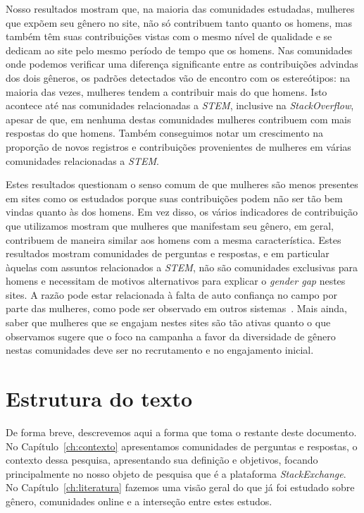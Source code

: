 Nosso resultados mostram que, na maioria das comunidades estudadas, mulheres que expõem seu gênero no site, não só contribuem tanto quanto os homens, mas também têm suas contribuições vistas com o mesmo nível de qualidade e se dedicam ao site pelo mesmo período de tempo que os homens. Nas comunidades onde podemos verificar uma diferença significante entre as contribuições advindas dos dois gêneros, os padrões detectados vão de encontro com os estereótipos: na maioria das vezes, mulheres tendem a contribuir mais do que homens. Isto acontece até nas comunidades relacionadas a \emph{STEM}, inclusive na \emph{StackOverflow}, apesar de que, em nenhuma destas comunidades mulheres contribuem com mais respostas do que homens. Também conseguimos notar um crescimento na proporção de novos registros e contribuições provenientes de mulheres em várias comunidades relacionadas a \emph{STEM}.

Estes resultados questionam o senso comum de que mulheres são menos presentes em sites como os estudados porque suas contribuições podem não ser tão bem vindas quanto às dos homens. Em vez disso, os vários indicadores de contribuição que utilizamos mostram que mulheres que manifestam seu gênero, em geral, contribuem de maneira similar aos homens com a mesma característica. Estes resultados mostram comunidades de perguntas e respostas, e em particular àquelas com assuntos relacionados a \emph{STEM}, não são comunidades exclusivas para homens e necessitam de motivos alternativos para explicar o \textit{gender gap} nestes sites. A razão pode estar relacionada à falta de auto confiança no campo por parte das mulheres, como pode ser observado em outros sistemas~\cite{piazza:report}. Mais ainda, saber que mulheres que se engajam nestes sites são tão ativas quanto o que observamos sugere que o foco na campanha a favor da diversidade de gênero nestas comunidades deve ser no recrutamento e no engajamento inicial.

\section{Estrutura do texto}

De forma breve, descrevemos aqui a forma que toma o restante deste documento. No Capítulo~\ref{ch:contexto} apresentamos comunidades de perguntas e respostas, o contexto dessa pesquisa, apresentando sua definição e objetivos, focando principalmente no nosso objeto de pesquisa que é a plataforma \emph{StackExchange}. No Capítulo~\ref{ch:literatura} fazemos uma visão geral do que já foi estudado sobre gênero, comunidades online e a interseção entre estes estudos.

